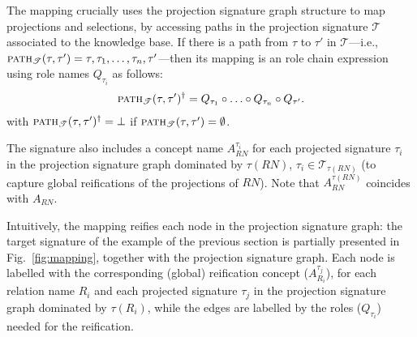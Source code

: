 \documentclass[envcountsame,draft]{llncs}
\newcommand{\pth}[2]{\ensuremath{\textsc{path}_{\mathscr{T}}(#1,#2)}\xspace}
\newcommand{\chd}[2]{\ensuremath{\textsc{child}_{\mathscr{T}}(#1,#2)}\xspace}
\begin{document}
The mapping crucially uses the projection signature graph structure to map projections and selections, by accessing paths in the projection signature $\mathscr{T}$ associated to the \DLRpm knowledge base. If there is a path from ${\tau}$ to ${\tau'}$ in $\mathscr{T}$---i.e., $\pth{\tau}{\tau'} = \tau,\tau_1,\ldots,\tau_n, \tau'$---then its mapping is an \ALCQI  role chain expression using role names $Q_{\tau_i}$ as follows:
%
\begin{align*}
	\pth{\tau}{\tau'}^\dag = Q_{\tau_1}\chain\ldots\chain Q_{\tau_n}\chain Q_{\tau'}. 
\end{align*}
%
\noindent with $\pth{\tau}{\tau'}^\dag = \bot$ if $\pth{\tau}{\tau'} = \emptyset$.


The \ALCQI signature also includes a concept name $A_{R\!N}^{\tau_i}$ for each projected signature $\tau_i$ in the projection signature graph dominated by $\tau(R\!N)$, $\tau_i\in\mathscr{T}_{\tau(R\!N)}$ (to capture global reifications of the projections of $R\!N$). Note that $A_{R\!N}^{\tau(R\!N)}$ coincides with $A_{R\!N}$. 

Intuitively, the mapping reifies each node in the projection signature graph: the target \ALCQI signature of the example of the previous section is partially presented in Fig.~\ref{fig:mapping}, together with the projection signature graph. Each node is labelled with the corresponding (global) reification concept ($A_{R_i}^{\tau_j}$), for each relation name $R_i$ and each projected signature $\tau_j$ in the projection signature graph dominated by $\tau(R_i)$, while the edges are labelled by the roles ($Q_{\tau_i}$) needed for the reification.
\end{document}
